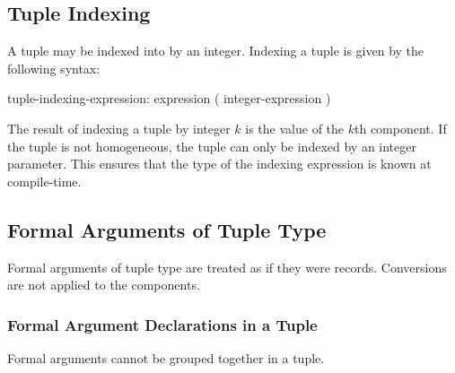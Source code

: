 \subsection{Tuple Indexing}
\label{Tuple_Indexing}

A tuple may be indexed into by an integer.  Indexing a tuple is given
by the following syntax:
\begin{syntax}
tuple-indexing-expression:
  expression ( integer-expression )
\end{syntax}

The result of indexing a tuple by integer $k$ is the value of the
$k$th component.  If the tuple is not homogeneous, the tuple can only
be indexed by an integer parameter.  This ensures that the type of the
indexing expression is known at compile-time.

\subsection{Formal Arguments of Tuple Type}
\label{Formal_Arguments_of_Tuple_Type}


\begin{status}
Formal arguments of tuple type are treated as if they were records.
Conversions are not applied to the components.
\end{status}

\subsubsection{Formal Argument Declarations in a Tuple}
\label{Formal_Argument_Declarations_in_a_Tuple}


\begin{status}
Formal arguments cannot be grouped together in a tuple.
\end{status}
